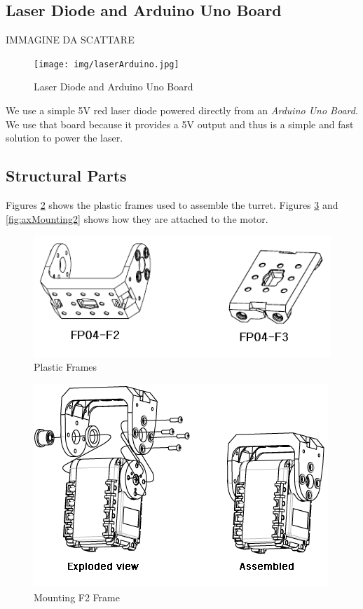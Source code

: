 \subsection{Laser Diode and Arduino Uno Board}
IMMAGINE DA SCATTARE\\
\begin{figure}
	\centering
	\texttt{[image: img/laserArduino.jpg]}%
	\caption{Laser Diode and Arduino Uno Board}
	\label{fig:laserArduino}
\end{figure}
We use a simple 5V red laser diode powered directly from an \emph{Arduino Uno Board}. We use that board because it provides a 5V output and thus is a simple and fast solution to power the laser.
\subsection{Structural Parts}
Figures \ref{fig:axFrames} shows the plastic frames used to assemble the turret. Figures \ref{fig:axMounting1} and \ref{fig:axMounting2} shows how they are attached to the motor.
\begin{figure}
	\centering
	\includegraphics[width=\textwidth]{img/axFrames.png}%
	\caption{Plastic Frames}
	\label{fig:axFrames}
\end{figure}
\begin{figure}
	\centering
	\includegraphics[width=\textwidth]{img/axMounting1.png}%
	\caption{Mounting F2 Frame}
	\label{fig:axMounting1}
\end{figure}
